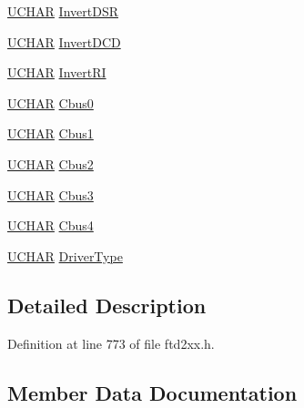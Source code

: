 \begin{DoxyCompactItemize}
\hyperlink{CatCaloProto40MHz_2inc_2WinTypes_8h_a4f4bb67531a9bf6f0b9c6ad76aeba587}{U\+C\+H\+AR} \hyperlink{structft__eeprom__232r_af9f2706ecbe6182d52bce8d237cc9162}{Invert\+D\+SR}
\item 
\hyperlink{CatCaloProto40MHz_2inc_2WinTypes_8h_a4f4bb67531a9bf6f0b9c6ad76aeba587}{U\+C\+H\+AR} \hyperlink{structft__eeprom__232r_a5ed1bcd1082728d070876c21c167743e}{Invert\+D\+CD}
\item 
\hyperlink{CatCaloProto40MHz_2inc_2WinTypes_8h_a4f4bb67531a9bf6f0b9c6ad76aeba587}{U\+C\+H\+AR} \hyperlink{structft__eeprom__232r_a1f9d1fbebcbc86c8a27d2abf6b9169f7}{Invert\+RI}
\item 
\hyperlink{CatCaloProto40MHz_2inc_2WinTypes_8h_a4f4bb67531a9bf6f0b9c6ad76aeba587}{U\+C\+H\+AR} \hyperlink{structft__eeprom__232r_a1d81e0319e53a72bd067a3de6387f4d8}{Cbus0}
\item 
\hyperlink{CatCaloProto40MHz_2inc_2WinTypes_8h_a4f4bb67531a9bf6f0b9c6ad76aeba587}{U\+C\+H\+AR} \hyperlink{structft__eeprom__232r_aa0ed7fa40a23e6e17359c1fec9dc2677}{Cbus1}
\item 
\hyperlink{CatCaloProto40MHz_2inc_2WinTypes_8h_a4f4bb67531a9bf6f0b9c6ad76aeba587}{U\+C\+H\+AR} \hyperlink{structft__eeprom__232r_a697c610b8e23ae556274c34703fd0582}{Cbus2}
\item 
\hyperlink{CatCaloProto40MHz_2inc_2WinTypes_8h_a4f4bb67531a9bf6f0b9c6ad76aeba587}{U\+C\+H\+AR} \hyperlink{structft__eeprom__232r_af6c591aa67f0e9ff287da8af81f7399e}{Cbus3}
\item 
\hyperlink{CatCaloProto40MHz_2inc_2WinTypes_8h_a4f4bb67531a9bf6f0b9c6ad76aeba587}{U\+C\+H\+AR} \hyperlink{structft__eeprom__232r_a390714a332684ea05618238e7388773f}{Cbus4}
\item 
\hyperlink{CatCaloProto40MHz_2inc_2WinTypes_8h_a4f4bb67531a9bf6f0b9c6ad76aeba587}{U\+C\+H\+AR} \hyperlink{structft__eeprom__232r_a43812e19d6119e277b91f10e8db8b651}{Driver\+Type}
\end{DoxyCompactItemize}


\subsection{Detailed Description}


Definition at line 773 of file ftd2xx.\+h.



\subsection{Member Data Documentation}
\mbox{\label{structft__eeprom__232r_a1d81e0319e53a72bd067a3de6387f4d8}} 
